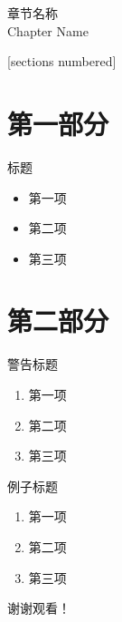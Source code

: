 \documentclass[wide]{styles/cuzbeamer}
\begin{document}
    
    \maketitle

    \begin{standout}[第X章]
        章节名称\\
        Chapter Name
    \end{standout}

    \begin{frame}
        [sections numbered]
        \tableofcontents
    \end{frame}

    \section{第一部分}

    \begin{frame}
        \begin{block}{标题}
            \begin{itemize}
                \item 第一项
                \item 第二项
                \item 第三项
            \end{itemize}
        \end{block}
    \end{frame}

    \section{第二部分}

    \begin{frame}
        \begin{alertblock}{警告标题}
            \begin{enumerate}
                \item 第一项
                \item 第二项
                \item 第三项
            \end{enumerate}
        \end{alertblock}
    \end{frame}

    \begin{frame}
        \begin{exampleblock}{例子标题}
            \begin{enumerate}
                \item 第一项
                \item 第二项
                \item 第三项
            \end{enumerate}
        \end{exampleblock}
    \end{frame}

    \begin{frame}[standout]
        谢谢观看！
    \end{frame}
\end{document}

